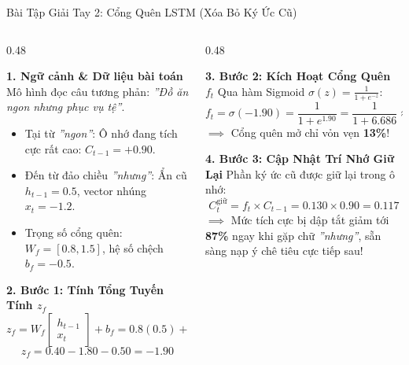 \documentclass[aspectratio=169, 10pt]{beamer}
\begin{document}
\begin{frame}{Bài Tập Giải Tay 2: Cổng Quên LSTM (Xóa Bỏ Ký Ức Cũ)}
  \begin{columns}[T, onlytextwidth]
    \begin{column}{0.48\textwidth}
      \begin{block}{\small\textbf{1. Ngữ cảnh \& Dữ liệu bài toán}}
        \fontsize{7.5}{9.5}\selectfont
        Mô hình đọc câu tương phản: \textit{''Đồ ăn ngon nhưng phục vụ tệ''}.
        \begin{itemize}\setlength{\itemsep}{0.12em}
          \item Tại từ \textit{''ngon''}: Ô nhớ đang tích cực rất cao: $C_{t-1} = \mathbf{+0.90}$.
          \item Đến từ đảo chiều \textit{''nhưng''}: Ẩn cũ $h_{t-1} = 0.5$, vector nhúng $x_t = -1.2$.
          \item Trọng số cổng quên: $W_f = [0.8, 1.5]$, hệ số chệch $b_f = -0.5$.
        \end{itemize}
      \end{block}
      \vspace{0.1cm}
      \begin{exampleblock}{\small\textbf{2. Bước 1: Tính Tổng Tuyến Tính $z_f$}}
        \fontsize{7.5}{9.5}\selectfont
        $$z_f = W_f \begin{bmatrix} h_{t-1} \\ x_t \end{bmatrix} + b_f = 0.8(0.5) + 1.5(-1.2) - 0.5$$
        $$z_f = 0.40 - 1.80 - 0.50 = \mathbf{-1.90}$$
      \end{exampleblock}
    \end{column}
    \hfill
    \begin{column}{0.48\textwidth}
      \begin{exampleblock}{\small\textbf{3. Bước 2: Kích Hoạt Cổng Quên $f_t$}}
        \fontsize{7.5}{9.5}\selectfont
        Qua hàm Sigmoid $\sigma(z) = \frac{1}{1 + e^{-z}}$:
        $$f_t = \sigma(-1.90) = \frac{1}{1 + e^{1.90}} = \frac{1}{1 + 6.686} \approx \mathbf{0.130}$$
        $\implies$ Cổng quên mở chỉ vỏn vẹn \textbf{13\%}!
      \end{exampleblock}
      \vspace{0.1cm}
      \begin{alertblock}{\small\textbf{4. Bước 3: Cập Nhật Trí Nhớ Giữ Lại}}
        \fontsize{7.5}{9.5}\selectfont
        Phần ký ức cũ được giữ lại trong ô nhớ:
        $$C_t^{\text{giữ}} = f_t \times C_{t-1} = 0.130 \times 0.90 = \mathbf{0.117}$$
        $\implies$ Mức tích cực bị dập tắt giảm tới \textbf{87\%} ngay khi gặp chữ \textit{''nhưng''}, sẵn sàng nạp ý chê tiêu cực tiếp sau!
      \end{alertblock}
    \end{column}
  \end{columns}
\end{frame}
\end{document}
